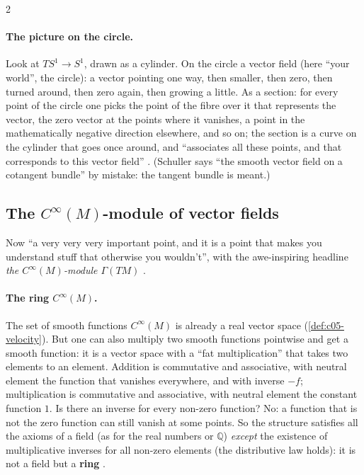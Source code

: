 \begin{paracol}{2}
\paragraph{The picture on the circle.} Look at $TS^1\to S^1$, drawn as a cylinder. On the circle a vector field (here ``your world'', the circle): a vector pointing one way, then smaller, then zero, then turned around, then zero again, then growing a little. As a section: for every point of the circle one picks the point of the fibre over it that represents the vector, the zero vector at the points where it vanishes, a point in the mathematically negative direction elsewhere, and so on;
the section is a curve on the cylinder that goes once around, and ``associates all these points, and that corresponds to this vector field'' .
(Schuller says ``the smooth vector field on a cotangent bundle'' by mistake: the tangent bundle is meant.)

\subsection{The $C^\infty(M)$-module of vector fields}

Now ``a very very very important point, and it is a point that makes you understand stuff that otherwise you wouldn't'', with the awe-inspiring headline \emph{the $C^\infty(M)$-module $\Gamma(TM)$} .

\paragraph{The ring $C^\infty(M)$.} The set of smooth functions $C^\infty(M)$ is already a real vector space (\cref{def:c05-velocity}). But one can also multiply two smooth functions pointwise and get a smooth function: it is a vector space with a ``fat multiplication'' that takes two elements to an element. Addition is commutative and associative, with neutral element the function that vanishes everywhere, and with inverse $-f$;
multiplication is commutative and associative, with neutral element the constant function $1$. Is there an inverse for every non-zero function? No: a function that is not the zero function can still vanish at some points. So the structure satisfies all the axioms of a field (as for the real numbers or $\mathbb Q$) \emph{except} the existence of multiplicative inverses for all non-zero elements (the distributive law holds): it is not a field but a \textbf{ring}
.


\end{paracol}
